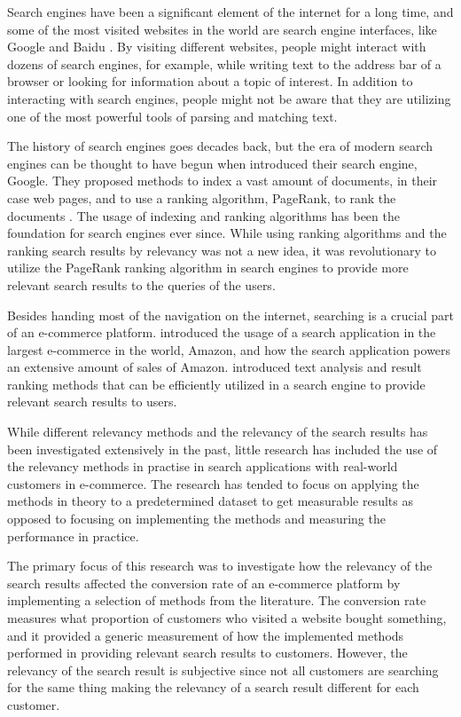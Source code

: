 
Search engines have been a significant element of the internet for a long time, 
and some of the most visited websites in the world are search engine interfaces, 
like Google and Baidu \cite{alexa}.
By visiting different websites, people might interact with dozens of search engines, 
for example, while writing text to the address bar of a browser or looking for information about a topic of interest.
In addition to interacting with search engines, people might not be aware that they are utilizing one of the most 
powerful tools of parsing and matching text.


The history of search engines goes decades back, but the era of modern search engines can be thought to have begun
when \citeauthor{googleInit} \cite{googleInit} introduced their search engine, Google. 
They proposed methods to index a vast amount of documents, in their case web pages, 
and to use a ranking algorithm, PageRank, to rank the documents \cite{googleInit}. 
The usage of indexing and ranking algorithms has been the foundation for search engines ever since.
While using ranking algorithms and the ranking search results by relevancy was not a new idea, 
it was revolutionary to utilize the PageRank ranking algorithm in search engines to provide 
more relevant search results to the queries of the users.


Besides handing most of the navigation on the internet, 
searching is a crucial part of an e-commerce platform. 
\citeauthor{amazonJoyRanking} \cite{amazonJoyRanking} introduced the usage of a search application 
in the largest e-commerce in the world, Amazon, 
and how the search application powers an extensive amount of sales of Amazon.
\citeauthor{relevantSearch} \cite{relevantSearch} introduced text analysis and result ranking methods
that can be efficiently utilized in a search engine to provide relevant search results to users.


While different relevancy methods and the relevancy of the search results has been investigated extensively in the past, 
little research has included the use of the relevancy methods in practise in search applications 
with real-world customers in e-commerce. 
The research has tended to focus on applying the methods in theory to a predetermined dataset to get measurable results
as opposed to focusing on implementing the methods and measuring the performance in practice. 


The primary focus of this research was to investigate how the relevancy of the search results affected 
the conversion rate of an e-commerce platform by implementing a selection of methods from the literature. 
The conversion rate measures what proportion of customers who visited a website bought something, 
and it provided a generic measurement of how the implemented methods performed in 
providing relevant search results to customers.
However, the relevancy of the search result is subjective 
since not all customers are searching for the same thing making the relevancy of a search result 
different for each customer.


